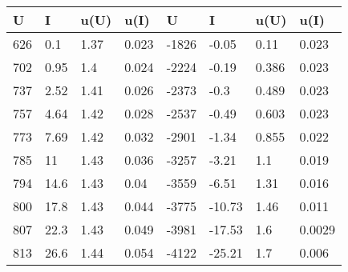 \begin{table}[H]\centering 
 \begin{tabular}{|l|l|l|l|l|l|l|l|}
\hline
 \rowcolor{lightgray} 
  U  &  I   &  u(U)  &  u(I)  &   U   &   I    &  u(U)  &  u(I)  \\ \hline

 626 & 0.1  &  1.37  & 0.023  & -1826 & -0.05  &  0.11  & 0.023  \\ \hline
 702 & 0.95 &  1.4   & 0.024  & -2224 & -0.19  & 0.386  & 0.023  \\ \hline
 737 & 2.52 &  1.41  & 0.026  & -2373 &  -0.3  & 0.489  & 0.023  \\ \hline
 757 & 4.64 &  1.42  & 0.028  & -2537 & -0.49  & 0.603  & 0.023  \\ \hline
 773 & 7.69 &  1.42  & 0.032  & -2901 & -1.34  & 0.855  & 0.022  \\ \hline
 785 &  11  &  1.43  & 0.036  & -3257 & -3.21  &  1.1   & 0.019  \\ \hline
 794 & 14.6 &  1.43  &  0.04  & -3559 & -6.51  &  1.31  & 0.016  \\ \hline
 800 & 17.8 &  1.43  & 0.044  & -3775 & -10.73 &  1.46  & 0.011  \\ \hline
 807 & 22.3 &  1.43  & 0.049  & -3981 & -17.53 &  1.6   & 0.0029 \\ \hline
 813 & 26.6 &  1.44  & 0.054  & -4122 & -25.21 &  1.7   & 0.006  \\ \hline

\end{tabular}
\end{table}